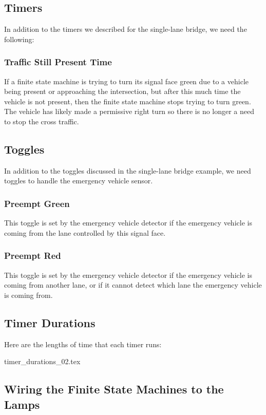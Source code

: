 \documentclass[letterpaper,twoside]{article}
\begin{document}
\subsection{Timers}

In addition to the timers we described for the single-lane bridge,
we need the following:

\subsubsection{Traffic Still Present Time}
If a finite state machine is trying to turn its signal face green due to
a vehicle being present or approaching the intersection, but after this
much time the vehicle is not present, then the finite state machine stops
trying to turn green.  The vehicle has likely made a permissive right
turn so there is no longer a need to stop the cross traffic.

\subsection{Toggles}

In addition to the toggles discussed in the single-lane bridge example,
we need toggles to handle the emergency vehicle sensor.

\subsubsection{Preempt Green}

This toggle is set by the emergency vehicle detector if the emergency
vehicle is coming from the lane controlled by this signal face.

\subsubsection{Preempt Red}

This toggle is set by the emergency vehicle detector if the emergency
vehicle is coming from another lane, or if it cannot detect
which lane the emergency vehicle is coming from.

\subsection{Timer Durations}

Here are the lengths of time that each timer runs:

 {timer_durations_02.tex}

\subsection{Wiring the Finite State Machines to the Lamps}
\end{document}
